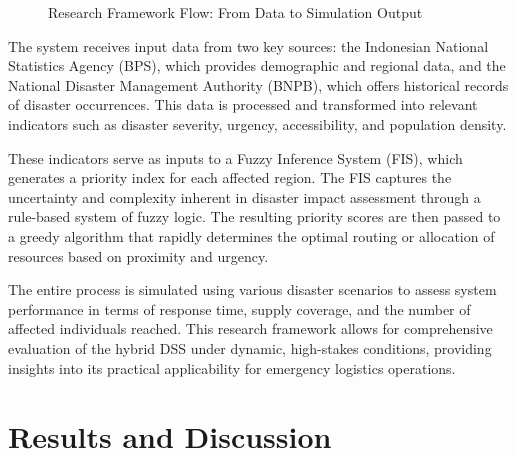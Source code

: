 \documentclass[journal,final,a4paper,twoside,11pt]{IEEEtran}
\begin{document}
\begin{figure}[htbp]
\centering
{}
\caption{Research Framework Flow: From Data to Simulation Output}
\label{fig:research_framework}
\end{figure}

The system receives input data from two key sources: the Indonesian National Statistics Agency (BPS), which provides demographic and regional data, and the National Disaster Management Authority (BNPB), which offers historical records of disaster occurrences. This data is processed and transformed into relevant indicators such as disaster severity, urgency, accessibility, and population density.

These indicators serve as inputs to a Fuzzy Inference System (FIS), which generates a priority index for each affected region. The FIS captures the uncertainty and complexity inherent in disaster impact assessment through a rule-based system of fuzzy logic. The resulting priority scores are then passed to a greedy algorithm that rapidly determines the optimal routing or allocation of resources based on proximity and urgency.

The entire process is simulated using various disaster scenarios to assess system performance in terms of response time, supply coverage, and the number of affected individuals reached. This research framework allows for comprehensive evaluation of the hybrid DSS under dynamic, high-stakes conditions, providing insights into its practical applicability for emergency logistics operations.

\section{Results and Discussion}
\end{document}
